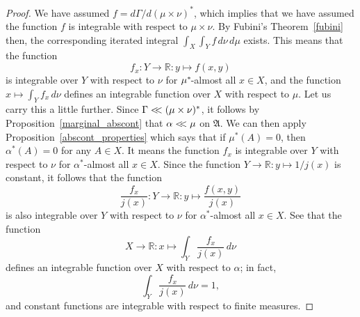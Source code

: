 \documentclass[
twoside=true,
paper=letter,
fontsize=9pt,
pagesize=auto,
leqno,
openany,
headsepline,
overfullrule,
]{scrbook}
\theoremstyle{plain}
\theoremstyle{plain}
\theoremstyle{definition}
\theoremstyle{bfnoteitalic}
\theoremstyle{bfnoteroman}
\newcommand{\sigalg}[1]{\mathfrak{#1}}
\newcommand{\R}{\mathbb{R}}
\newcommand{\sigmaalgebra}{\sigalg{A}}
\newcommand{\kernast}{\ast\kern-1pt}
\newcommand{\funcf}{f}
\newcommand{\funcj}{j}
\newcommand{\function}{f}
\newcommand{\measurespace}{X}
\newcommand{\measurespaceii}{Y}
\newcommand{\mspaceelt}{x}
\newcommand{\mspaceeltii}{y}
\newcommand{\abscont}{\mathrel{< \kern-3.5pt <}}
\newcommand{\measure}{\mu}
\newcommand{\measureii}{\nu}
\newcommand{\seti}{A}
\newcommand{\measonprod}{\Gamma}%
\newcommand{\marginalone}{\alpha}%
\begin{document}
\begin{proof}
We have assumed
$\function = d\measonprod / d(\measure\times\measureii)^*$,
which implies that we have assumed the function $\function$ is integrable with respect to 
$\measure\times\measureii$.
By Fubini's Theorem~\ref{fubini} then, the corresponding iterated integral
$\int_\measurespace\int_\measurespaceii \funcf \,d\measureii\,d\measure$
exists.
This means that the function
\[
\function_\mspaceelt:\measurespaceii\to\R :
\mspaceeltii\mapsto\function(\mspaceelt,\mspaceeltii)
\]
is integrable over $\measurespaceii$ with respect to $\measureii$ for 
$\measure^\kernast$-almost all 
$\mspaceelt\in\measurespace$,
and the function 
$\mspaceelt\mapsto 
\int_\measurespaceii \function_\mspaceelt \, d\measureii$ 
defines an integrable function over $\measurespace$ with respect to $\measure$.
Let us carry this
a little further.  
Since $\measonprod \abscont (\measure\times\measureii)^*$, it follows by Proposition~\ref{marginal_abscont} that
$\marginalone\abscont\measure$ on $\sigmaalgebra$.
We can then apply Proposition~\ref{abscont_properties} which says that if
$\measure^*(\seti)=0$, then $\marginalone^*(\seti)=0$ for any $\seti\in\measurespace$.
It means the function 
$\function_\mspaceelt$ 
is integrable over $\measurespaceii$ with respect to $\measureii$ for 
$\marginalone^*$-almost all $\mspaceelt\in\measurespace$.
Since the function
$\measurespaceii\to\R:\mspaceeltii\mapsto 1/ \funcj(\mspaceelt)$ 
is  constant, it follows that the function
\[
\frac{\function_\mspaceelt}{\funcj(\mspaceelt)} :
\measurespaceii\to\R :
\mspaceeltii\mapsto
\frac{\function(\mspaceelt,\mspaceeltii)}{\funcj(\mspaceelt)}
\]
is also integrable over $\measurespaceii$ with respect to $\measureii$ for 
$\marginalone^*$-almost all $\mspaceelt\in\measurespace$.
See that the function
\[
\measurespace\to\R :
\mspaceelt \mapsto 
\int_\measurespaceii 
\frac{\function_\mspaceelt}{\funcj(\mspaceelt)} 
\, d\measureii
\]
defines an integrable function over $\measurespace$ with respect to 
$\marginalone$; in fact,
\[
\int_\measurespaceii 
\frac{\function_\mspaceelt}{\funcj(\mspaceelt)} 
\, d\measureii
= 1,
\]
and constant functions are integrable with respect to finite measures.


\end{proof}
\end{document}
